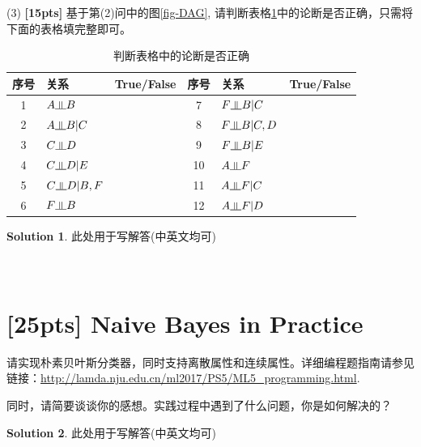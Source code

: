 \documentclass[a4paper,UTF8]{article}
\numberwithin{equation}{section}
\theoremstyle{definition}
\newtheorem*{solution}{Solution}
\newcommand{\indep}{\rotatebox[origin=c]{90}{$\models$}}
\begin{document}
(3) \textbf{[15pts]} 基于第(2)问中的图\ref{fig-DAG}, 请判断表格\ref{table:DAG}中的论断是否正确，只需将下面的表格填完整即可。
\begin{table}[h]
\centering
\caption{判断表格中的论断是否正确}
\label{table:DAG}
\begin{tabular}{c|l|c||c|l|c}\hline
序号   		& 		关系  			& True/False 	& 序号   	& 		关系  			& True/False \\ \hline
1			&	$A \indep B$ 		    & 			    & 7  		& 	$F \indep B|C$ 		& 			 \\
2			&	$A \indep B|C$ 	    & 			    & 8  		& 	$F \indep B|C, D$ 	& 			 \\
3			&	$C \indep D $		    & 			    & 9  		& 	$F \indep B|E$ 		& 			 \\
4			&	$C \indep D|E$ 	    & 			    & 10  		& 	$A \indep F $			& 			 \\
5			&	$C \indep D|B, F$     & 			    & 11  		& 	$A \indep F|C$ 		& 			 \\
6			&	$F \indep B $		    & 			    & 12  		& 	$A \indep F|D$ 		& 			 \\ \hline
\end{tabular}
\end{table}

\begin{solution}
此处用于写解答(中英文均可)
~\\
~\\
~\\
\end{solution}


\section{[25pts] Naive Bayes in Practice}
请实现朴素贝叶斯分类器，同时支持离散属性和连续属性。详细编程题指南请参见链接：\url{http://lamda.nju.edu.cn/ml2017/PS5/ML5_programming.html}. 

同时，请简要谈谈你的感想。实践过程中遇到了什么问题，你是如何解决的？
\begin{solution}
此处用于写解答(中英文均可)
~\\
~\\
~\\
\end{solution}
\end{document}
